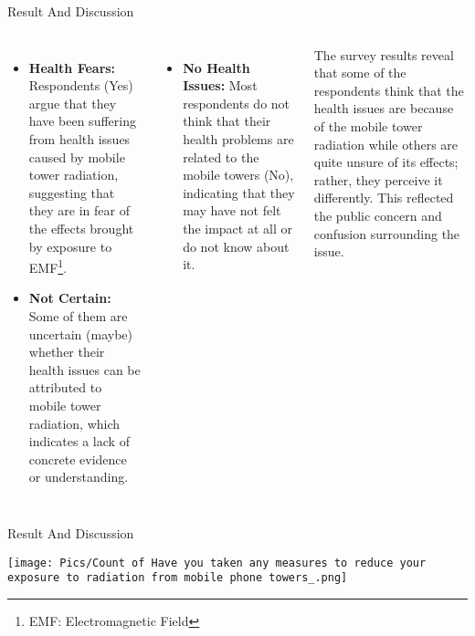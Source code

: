 \documentclass[7pt, aspectratio=169]{beamer}
\begin{document}
\begin{frame}{Result And Discussion}
\begin{columns}
    \begin{itemize}
        \item \textbf{Health Fears:} Respondents (Yes) argue that they have been suffering from health issues caused by mobile tower radiation, suggesting that they are in fear of the effects brought by exposure to EMF\footnote{EMF: Electromagnetic Field}.
        \item \textbf{Not Certain:} Some of them are uncertain (maybe) whether their health issues can be attributed to mobile tower radiation, which indicates a lack of concrete evidence or understanding.
    \end{itemize}

    
    \begin{itemize}
        \item \textbf{No Health Issues:} Most respondents do not think that their health problems are related to the mobile towers (No), indicating that they may have not felt the impact at all or do not know about it.
    \end{itemize}
    The survey results reveal that some of the respondents think that the health issues are because of the mobile tower radiation while others are quite unsure of its effects; rather, they perceive it differently. This reflected the public concern and confusion surrounding the issue.
\end{columns}
    
\end{frame}

\begin{frame}{Result And Discussion}
\begin{center}
    \texttt{[image: Pics/Count of Have you taken any measures to reduce your exposure to radiation from mobile phone towers\_.png]}
\end{center}
\end{frame}
\end{document}

